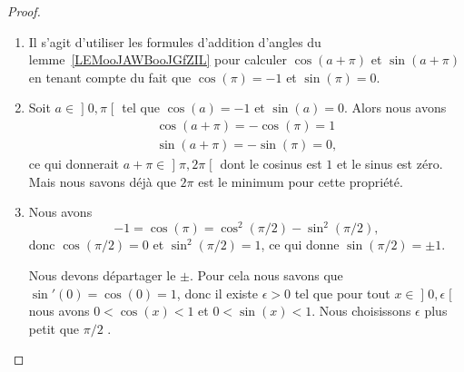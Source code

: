 \begin{proof}
\begin{enumerate}
		      Mais d'un autre côté, le nombre \( 2\pi\) est le plus petit \( T\) vérifiant \( \cos(T)=1\), \( \sin(T)=0\). Donc, avoir \( \cos(\pi)=1\) n'est pas possible. Nous concluons
		      \begin{subequations}
			      \begin{numcases}{}
				      \cos(\pi)=-1\\
				      \sin(\pi)=0.
			      \end{numcases}
		      \end{subequations}
		\item
		      Il s'agit d'utiliser les formules d'addition d'angles du lemme~\ref{LEMooJAWBooJGfZIL} pour calculer \( \cos(a+\pi)\) et \( \sin(a+\pi)\) en tenant compte du fait que \( \cos(\pi)=-1\) et \( \sin(\pi)=0\).
		\item
		      Soit \( a\in\mathopen] 0 , \pi \mathclose[\) tel que \( \cos(a)=-1\) et \( \sin(a)=0\). Alors nous avons
			      \begin{subequations}
				      \begin{align}
					      \cos(a+\pi)=-\cos(\pi)=1 \\
					      \sin(a+\pi)=-\sin(\pi)=0,
				      \end{align}
			      \end{subequations}
			      ce qui donnerait \( a+\pi\in\mathopen] \pi , 2\pi \mathclose[\) dont le cosinus est \( 1\) et le sinus est zéro. Mais nous savons déjà que \( 2\pi\) est le minimum pour cette propriété.
		\item
		      Nous avons
		      \begin{equation}
			      -1=\cos(\pi)=\cos^2(\pi/2)-\sin^2(\pi/2),
		      \end{equation}
		      donc \( \cos(\pi/2)=0\) et \( \sin^2(\pi/2)=1\), ce qui donne \( \sin(\pi/2)=\pm 1\).

		      Nous devons départager le \( \pm\). Pour cela nous savons que \( \sin'(0)=\cos(0)=1\), donc il existe \( \epsilon>0\) tel que pour tout \( x\in\mathopen] 0 , \epsilon \mathclose[\) nous avons \( 0<\cos(x)<1\) et \( 0<\sin(x)<1\). Nous choisissons \( \epsilon\) plus petit que \( \pi/2\) .


\end{enumerate}
\end{proof}
